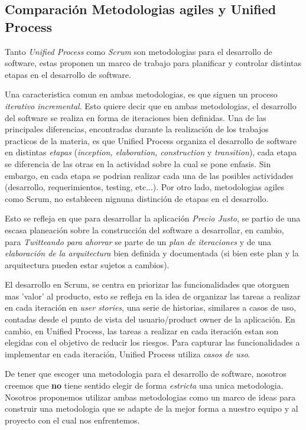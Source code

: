\subsection{Comparación Metodologias agiles y Unified Process}

	Tanto \emph{Unified Process} como \emph{Scrum} son metodologias para el desarrollo de software, estas proponen un marco de trabajo para planificar y controlar distintas etapas en el desarrollo de software.

	Una caracteristica comun en ambas metodologias, es que siguen un proceso \emph{iterativo incremental}. Esto quiere decir que en ambas metodologias, el desarrollo del software se realiza en forma de iteraciones bien definidas. Una de las principales diferencias, encontradas durante la realización de los trabajos practicos de la materia, es que Unified Process organiza el desarrollo de software en distintas \emph{etapas} (\emph{inception, elaboration, construction} y \emph{transition}), cada etapa se diferencia de las otras en la actividad sobre la cual se pone enfasis. Sin embargo, en cada etapa se podrian realizar cada una de las posibles actividades (desarrollo, requerimientos, testing, etc...). Por otro lado, metodologias agiles como Scrum, no establecen nignuna distinción de etapas en el desarrollo.

	Esto se refleja en que para desarrollar la aplicación \emph{Precio Justo}, se partio de una escasa planeación sobre la construcción del software a desarrollar, en cambio, para \emph{Twitteando para ahorrar} se parte de un \emph{plan de iteraciones} y de una \emph{elaboración de la arquitectura} bien definida y documentada (si bien este plan y la arquitectura pueden estar sujetos a cambios).

	El desarrollo en Scrum, se centra en priorizar las funcionalidades que otorguen mas 'valor' al producto, esto se refleja en la idea de organizar las tareas a realizar en cada iteración en \emph{user stories}, una serie de historias, similares a casos de uso, contadas desde el punto de vista del usuario/product owner de la aplicación. En cambio, en Unified Process, las tareas a realizar en cada iteración estan son elegidas con el objetivo de reducir los riesgos. Para capturar las funcionalidades a implementar en cada iteración, Unified Process utiliza \emph{casos de uso}.

	De tener que escoger una metodologia para el desarrollo de software, nosotros creemos que \textbf{no} tiene sentido elegir de forma \emph{estricta} una unica metodologia. Nosotros proponemos utilizar ambas metodologias como un marco de ideas para construir una metodologia que se adapte de la mejor forma a nuestro equipo y al proyecto con el cual nos enfrentemos.

